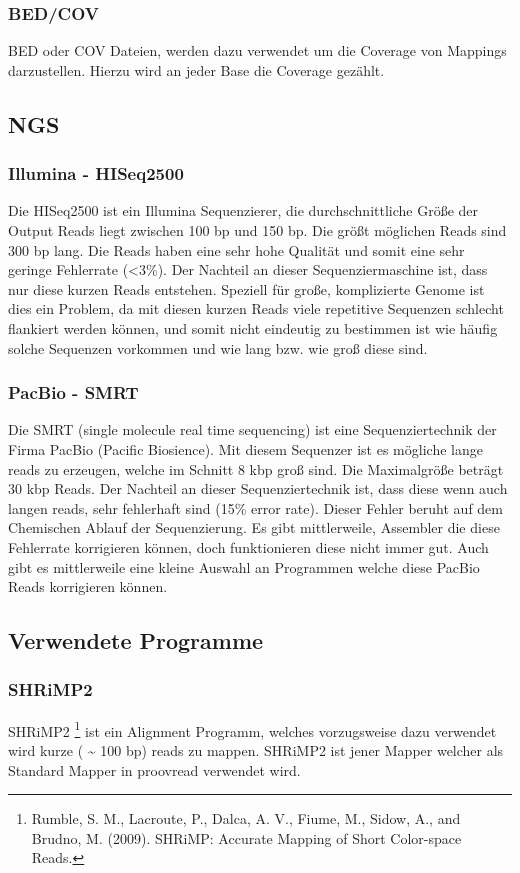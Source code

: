 \documentclass{scrartcl}
\begin{document}
\subsubsection{BED/COV}
\label{sec-4-1-4}
BED oder COV Dateien, werden dazu verwendet um die Coverage von Mappings darzustellen. Hierzu wird an jeder Base die Coverage gezählt.

\subsection{NGS}
\label{sec-4-2}
\subsubsection{Illumina - HISeq2500}
\label{sec-4-2-1}
Die HISeq2500 ist ein Illumina Sequenzierer, die durchschnittliche Größe der Output Reads liegt zwischen 100 bp und 150 bp.
Die größt möglichen Reads sind 300 bp lang. Die Reads haben eine sehr hohe Qualität und somit eine sehr geringe Fehlerrate (<3\%).
Der Nachteil an dieser Sequenziermaschine ist, dass nur diese kurzen Reads entstehen. Speziell für große, komplizierte Genome ist dies 
ein Problem, da mit diesen kurzen Reads viele repetitive Sequenzen schlecht flankiert werden können, und somit nicht eindeutig zu bestimmen ist
wie häufig solche Sequenzen vorkommen und wie lang bzw. wie groß diese sind.


\subsubsection{PacBio - SMRT}
\label{sec-4-2-2}
Die SMRT (single molecule real time sequencing) ist eine Sequenziertechnik der Firma PacBio (Pacific Biosience).
Mit diesem Sequenzer ist es mögliche lange reads zu erzeugen, welche im Schnitt 8 kbp groß sind. Die Maximalgröße 
beträgt 30 kbp Reads. Der Nachteil an dieser Sequenziertechnik ist, dass diese wenn auch langen reads, sehr fehlerhaft sind (15\% error rate).
Dieser Fehler beruht auf dem Chemischen Ablauf der Sequenzierung. Es gibt mittlerweile, Assembler die diese Fehlerrate korrigieren können, doch
funktionieren diese nicht immer gut. Auch gibt es mittlerweile eine kleine Auswahl an Programmen welche diese PacBio Reads korrigieren können.


\subsection{Verwendete Programme}
\label{sec-4-3}
\subsubsection{SHRiMP2}
\label{sec-4-3-1}
SHRiMP2 \footnote{Rumble, S. M., Lacroute, P., Dalca, A. V., Fiume, M., Sidow, A., and Brudno, M. (2009). 
SHRiMP: Accurate Mapping of Short Color-space Reads.} ist ein Alignment Programm, welches vorzugsweise dazu verwendet wird kurze ( \textasciitilde{} 100 bp) reads zu mappen. 
SHRiMP2 ist jener Mapper welcher als Standard Mapper in proovread verwendet wird.
\end{document}

